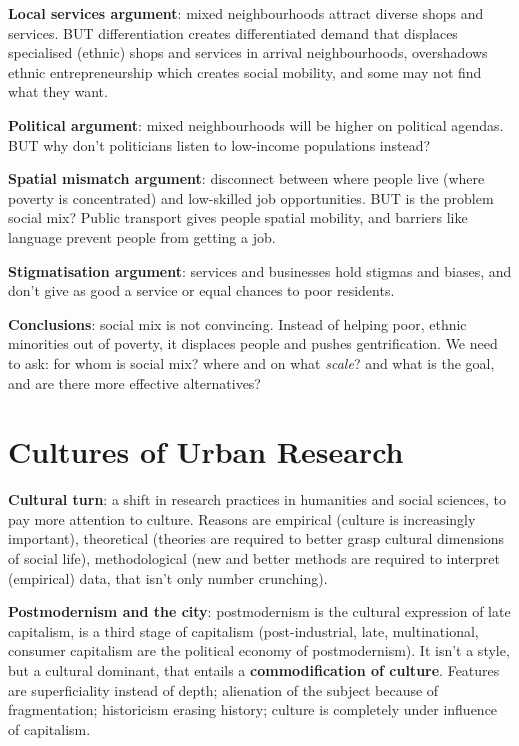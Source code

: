 \documentclass{article}
\newcommand{\alignedmarginpar}[1]{%
        \marginpar{\raggedright\small #1}
    }
\begin{document}
\textbf{Local services argument}: mixed neighbourhoods attract diverse shops and services. BUT differentiation creates differentiated demand that displaces specialised (ethnic) shops and services in arrival neighbourhoods, overshadows ethnic entrepreneurship which creates social mobility, and some may not find what they want.

\textbf{Political argument}:\alignedmarginpar{Environmental racism}mixed neighbourhoods will be higher on political agendas. BUT why don't politicians listen to low-income populations instead?

\textbf{Spatial mismatch argument}: disconnect between where people live (where poverty is concentrated) and low-skilled job opportunities. BUT is the problem social mix? Public transport gives people spatial mobility, and barriers like language prevent people from getting a job.

\textbf{Stigmatisation argument}: services and businesses hold stigmas and biases, and don't give as good a service or equal chances to poor residents.

\textbf{Conclusions}: social mix is not convincing. Instead of helping poor, ethnic minorities out of poverty, it displaces people and pushes gentrification. We need to ask: for whom is social mix? where and on what \textit{scale}? and what is the goal, and are there more effective alternatives? 

\pagebreak\section{Cultures of Urban Research}

\textbf{Cultural turn}: a shift in research practices in humanities and social sciences, to pay more attention to culture. Reasons are empirical (culture is increasingly important), theoretical (theories are required to better grasp cultural dimensions of social life), methodological (new and better methods are required to interpret (empirical) data, that isn't only number crunching).

\textbf{Postmodernism and the city}:\alignedmarginpar{Jameson,\\Bonaventura Hotel}postmodernism is the cultural expression of late capitalism, is a third stage of capitalism (post-industrial, late, multinational, consumer capitalism are the political economy of postmodernism). 
It isn't a style, but a cultural dominant, that entails a \textbf{commodification of culture}. Features are superficiality instead of depth; alienation of the subject because of fragmentation; historicism erasing history; culture is completely under influence of capitalism.
\end{document}
